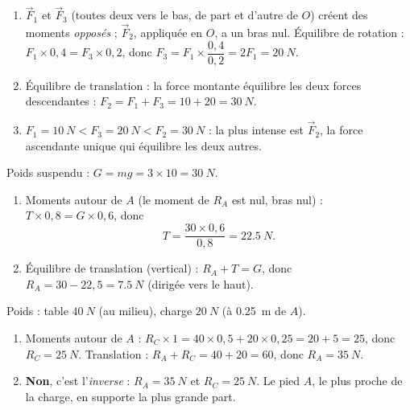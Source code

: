 \documentclass[11pt,a4paper]{article}
\newcommand{\vv}[1]{\vec{#1}}\newcommand{\ds}{\displaystyle}
\begin{document}
\begin{corrige}
\begin{enumerate}[label=\alph*)]
  \item $\vv F_1$ et $\vv F_3$ (toutes deux vers le bas, de part et d'autre de $O$) créent des moments
        \emph{opposés} ; $\vv F_2$, appliquée en $O$, a un bras nul. Équilibre de rotation :
        $F_1\times 0{,}4 = F_3\times 0{,}2$, donc
        $F_3 = F_1\times\dfrac{0{,}4}{0{,}2} = 2F_1 = \qty{20}{N}$.
  \item Équilibre de translation : la force montante équilibre les deux forces descendantes :
        $F_2 = F_1 + F_3 = 10 + 20 = \qty{30}{N}$.
  \item $F_1 = \qty{10}{N} < F_3 = \qty{20}{N} < F_2 = \qty{30}{N}$ : la plus intense est $\vv F_2$, la
        force ascendante unique qui équilibre les deux autres.
\end{enumerate}
\end{corrige}

\begin{corrige}
Poids suspendu : $G = m g = 3\times 10 = \qty{30}{N}$.
\begin{enumerate}[label=\alph*)]
  \item Moments autour de $A$ (le moment de $R_A$ est nul, bras nul) : $T\times 0{,}8 = G\times 0{,}6$,
        donc
        \[ T = \frac{30\times 0{,}6}{0{,}8} = \qty{22.5}{N}. \]
  \item Équilibre de translation (vertical) : $R_A + T = G$, donc
        $R_A = 30 - 22{,}5 = \qty{7.5}{N}$ (dirigée vers le haut).
\end{enumerate}
\end{corrige}

\begin{corrige}
Poids : table $\qty{40}{N}$ (au milieu), charge $\qty{20}{N}$ (à \qty{0.25}{m} de $A$).
\begin{enumerate}[label=\alph*)]
  \item Moments autour de $A$ : $R_C\times 1 = 40\times 0{,}5 + 20\times 0{,}25 = 20 + 5 = 25$, donc
        $R_C = \qty{25}{N}$. Translation : $R_A + R_C = 40+20 = 60$, donc $R_A = \qty{35}{N}$.
  \item \textbf{Non}, c'est l'\emph{inverse} : $R_A = \qty{35}{N}$ et $R_C = \qty{25}{N}$. Le pied $A$,
        le plus proche de la charge, en supporte la plus grande part.
\end{enumerate}
\end{corrige}
\end{document}
